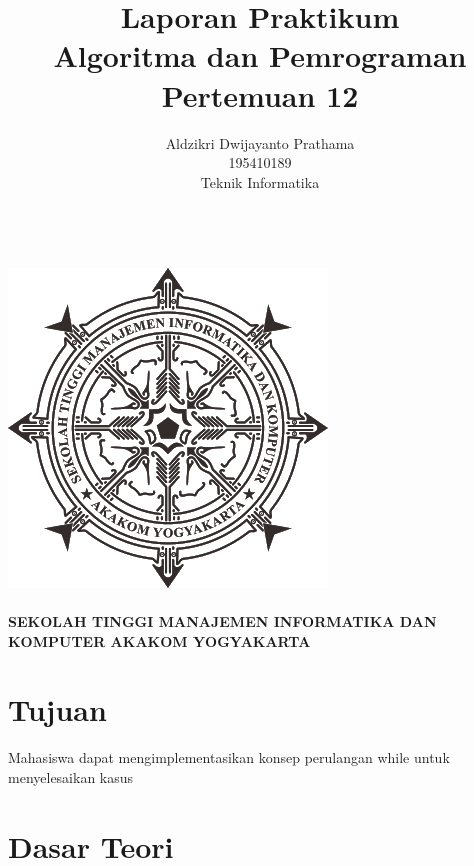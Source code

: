 \documentclass[a4paper,12pt]{article}
\begin{document}
\title{ {\Large Laporan Praktikum}\\ Algoritma dan Pemrograman \\{\Large Pertemuan 12}}

\author{Aldzikri Dwijayanto Prathama 
	\\195410189
	\\Teknik Informatika}
\makeatletter
\begin{titlepage}
	\begin{center}
		{\huge \bfseries \@title }\\[14ex]
		\includegraphics[scale=.8]{logo}\\[4ex]
		{\large \@author}\\[19ex]
		{\large \bfseries {SEKOLAH TINGGI MANAJEMEN INFORMATIKA DAN KOMPUTER
				AKAKOM YOGYAKARTA}}
	\end{center}


\end{titlepage}
\makeatother
\newpage
\tableofcontents
\newpage

\section{Tujuan}
Mahasiswa dapat mengimplementasikan konsep perulangan while untuk menyelesaikan kasus

\section{Dasar Teori}
\end{document}
